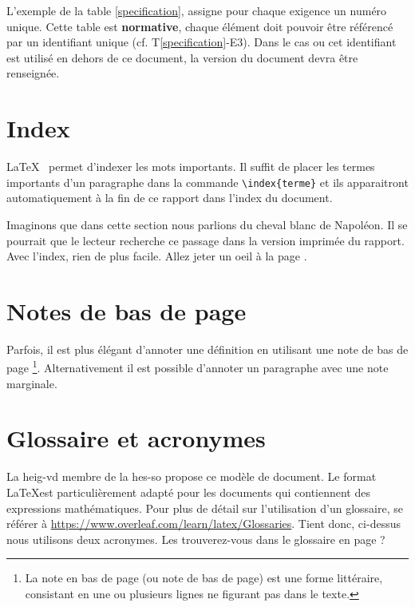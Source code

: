 \documentclass[
    iai, %
    eai, %
]{heig-tb}
\begin{document}
L'exemple de la table \ref{specification}, assigne pour chaque exigence un numéro unique. Cette table est \textbf{normative}, chaque élément doit pouvoir être référencé par un identifiant unique (cf. T\ref{specification}-E3). Dans le cas ou cet identifiant est utilisé en dehors de ce document, la version du document devra être renseignée.

\section{Index}
\LaTeX~ permet d'indexer les mots  importants. Il suffit de placer les termes importants d'un paragraphe dans la commande \texttt{\textbackslash index\{terme\}} et ils apparaitront automatiquement à la fin de ce rapport dans l'index du document.


Imaginons que dans cette section nous parlions du cheval blanc  de Napoléon. Il se pourrait que le lecteur recherche ce passage dans la version imprimée du rapport. Avec l'index, rien de plus facile. Allez jeter un oeil à la page \pageref{index}.

\section{Notes de bas de page}

 Parfois, il est plus élégant d'annoter une définition en utilisant une note de bas de page \footnote{La note en bas de page (ou note de bas de page) est une forme littéraire, consistant en une ou plusieurs lignes ne figurant pas dans le texte.}. Alternativement il est possible d'annoter un paragraphe avec une note marginale.

\section{Glossaire et acronymes}

La \Gls{heig-vd} membre de la \Gls{hes-so} propose ce modèle de document. Le format \LaTeX est particulièrement adapté pour les documents qui contiennent des expressions mathématiques. Pour plus de détail sur l'utilisation d'un glossaire, se référer à \url{https://www.overleaf.com/learn/latex/Glossaries}. Tient donc, ci-dessus nous utilisons deux acronymes. Les trouverez-vous dans le glossaire en page \pageref{glossaire} ?
\end{document}

